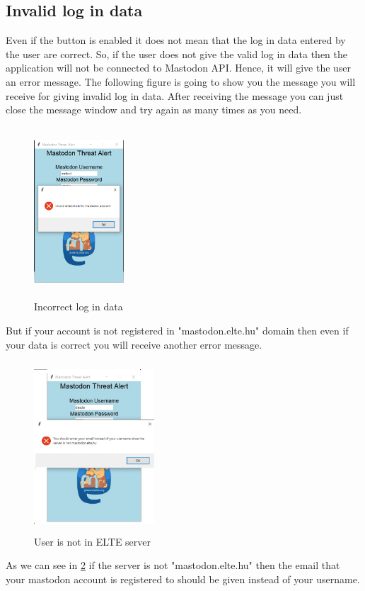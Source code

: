 \subsection{Invalid log in data}
\label{ss:incorrect_data}
Even if the button is enabled it does not mean that the log in data entered by the user
are correct. So, if the user does not give the valid log in data then the application 
will not be connected to Mastodon API. Hence, it will give the user an error message.
The following figure is going to show you the message you will receive for giving invalid 
log in data. After receiving the message you can just close the message window and try again
as many times as you need.
\begin{figure}[H]
	\centering
	\includegraphics[width=0.3\textwidth,height=240px]{images/invalidred.png}
	\caption{Incorrect log in data}
	\label{fig:invalid_data}
\end{figure}
But if your account is not registered in "mastodon.elte.hu" domain then
even if your data is correct you will receive another error message.
\begin{figure}[H]
	\centering
	\includegraphics[width=0.4\textwidth,height=240px]{images/notelteserver3.jpg}
	\caption{User is not in ELTE server}
	\label{fig:not_elte}
\end{figure}
As we can see in \ref{fig:not_elte} if the server is not "mastodon.elte.hu" then
the email that your mastodon account is registered to should be given instead of
your username.

